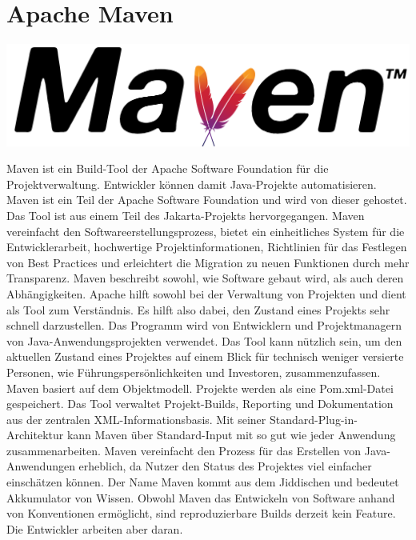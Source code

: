 \section{Apache Maven}
\includegraphics[scale=0.015]{pics/logos/apacheMavenLogo.png}

Maven ist ein Build-Tool der Apache Software Foundation für die Projektverwaltung. Entwickler können damit Java-Projekte automatisieren. Maven ist ein Teil der Apache Software Foundation und wird von dieser gehostet. 
Das Tool ist aus einem Teil des Jakarta-Projekts hervorgegangen. Maven vereinfacht den Softwareerstellungsprozess, bietet ein einheitliches System für die Entwicklerarbeit, hochwertige Projektinformationen, 
Richtlinien für das Festlegen von Best Practices und erleichtert die Migration zu neuen Funktionen durch mehr Transparenz. Maven beschreibt sowohl, wie Software gebaut wird, als auch deren Abhängigkeiten. 
Apache hilft sowohl bei der Verwaltung von Projekten und dient als Tool zum Verständnis. Es hilft also dabei, den Zustand eines Projekts sehr schnell darzustellen.
Das Programm wird von Entwicklern und Projektmanagern von Java-Anwendungsprojekten verwendet. Das Tool kann nützlich sein, um den aktuellen Zustand eines Projektes 
auf einem Blick für technisch weniger versierte Personen, wie Führungspersönlichkeiten und Investoren, zusammenzufassen. Maven basiert auf dem Objektmodell. 
Projekte werden als eine Pom.xml-Datei gespeichert. Das Tool verwaltet Projekt-Builds, Reporting und Dokumentation aus der zentralen XML-Informationsbasis. 
Mit seiner Standard-Plug-in-Architektur kann Maven über Standard-Input mit so gut wie jeder Anwendung zusammenarbeiten.
Maven vereinfacht den Prozess für das Erstellen von Java-Anwendungen erheblich, da Nutzer den Status des Projektes viel einfacher einschätzen können.
Der Name Maven kommt aus dem Jiddischen und bedeutet Akkumulator von Wissen. Obwohl Maven das Entwickeln von Software anhand von Konventionen ermöglicht, 
sind reproduzierbare Builds derzeit kein Feature. Die Entwickler arbeiten aber daran. 
\cite{sysarch-maven-1}

